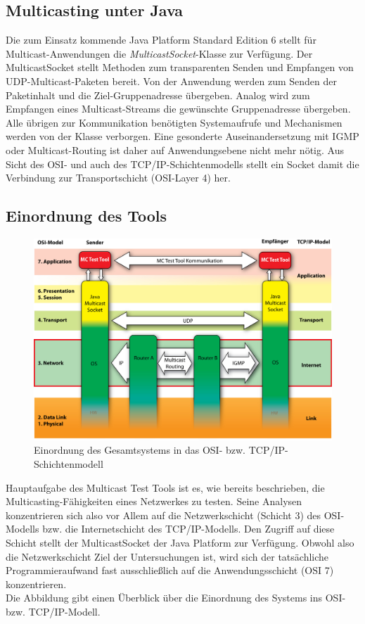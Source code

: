 \subsection{Multicasting unter Java}

Die zum Einsatz kommende Java Platform Standard Edition 6 stellt für
Multicast-Anwendungen die \emph{MulticastSocket}-Klasse zur Verfügung. Der
MulticastSocket stellt Methoden zum transparenten Senden und Empfangen von
UDP-Multicast-Paketen bereit. Von der Anwendung werden zum Senden der
Paketinhalt und die Ziel-Gruppenadresse übergeben. Analog wird zum
Empfangen eines Multicast-Streams die gewünschte Gruppenadresse übergeben. Alle
übrigen zur Kommunikation benötigten Systemaufrufe und Mechanismen werden von
der Klasse verborgen. Eine gesonderte Auseinandersetzung mit IGMP oder
Multicast-Routing ist daher auf Anwendungsebene nicht mehr nötig. Aus Sicht des
OSI- und auch des TCP/IP-Schichtenmodells stellt ein Socket damit die Verbindung
zur Transportschicht (OSI-Layer 4) her.

\subsection{Einordnung des Tools}

\begin{figure}[H]
\includegraphics[width=15cm]{images/mc_osi_einordnung.jpg}
\centering
\caption{Einordnung des Gesamtsystems in das OSI- bzw. TCP/IP-Schichtenmodell}
\label{mc_osi_einordnung}
\end{figure}

Hauptaufgabe des Multicast Test Tools ist es, wie bereits beschrieben, die
Multicasting-Fähigkeiten eines Netzwerkes zu testen. Seine Analysen
konzentrieren sich also vor Allem auf die Netzwerkschicht (Schicht 3) des
OSI-Modells bzw. die Internetschicht des TCP/IP-Modells. Den Zugriff auf diese
Schicht stellt der MulticastSocket der Java Platform zur Verfügung. Obwohl also
die Netzwerkschicht Ziel der Untersuchungen ist, wird sich der tatsächliche
Programmieraufwand fast ausschließlich auf die Anwendungsschicht (OSI 7)
konzentrieren.\\
Die Abbildung gibt einen Überblick über die Einordnung des
Systems ins OSI- bzw. TCP/IP-Modell.


